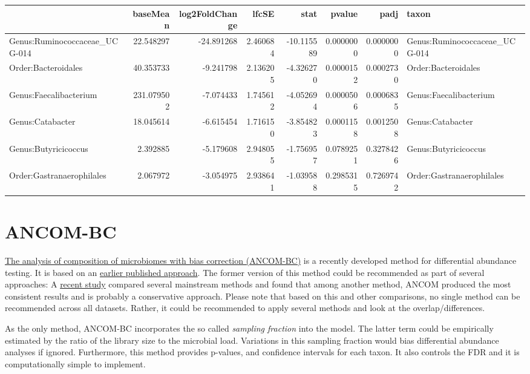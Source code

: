 \documentclass[
  oneside]{book}
\begin{document}
\begin{table}
\centering
\begin{tabular}{l|r|r|r|r|r|r|l}
\hline
  & baseMean & log2FoldChange & lfcSE & stat & pvalue & padj & taxon\\
\hline
Genus:Ruminococcaceae\_UCG-014 & 22.548297 & -24.891268 & 2.460684 & -10.115589 & 0.0000000 & 0.0000000 & Genus:Ruminococcaceae\_UCG-014\\
\hline
Order:Bacteroidales & 40.353733 & -9.241798 & 2.136205 & -4.326270 & 0.0000152 & 0.0002730 & Order:Bacteroidales\\
\hline
Genus:Faecalibacterium & 231.079502 & -7.074433 & 1.745612 & -4.052694 & 0.0000506 & 0.0006835 & Genus:Faecalibacterium\\
\hline
Genus:Catabacter & 18.045614 & -6.615454 & 1.716150 & -3.854823 & 0.0001158 & 0.0012508 & Genus:Catabacter\\
\hline
Genus:Butyricicoccus & 2.392885 & -5.179608 & 2.948055 & -1.756957 & 0.0789251 & 0.3278426 & Genus:Butyricicoccus\\
\hline
Order:Gastranaerophilales & 2.067972 & -3.054975 & 2.938641 & -1.039588 & 0.2985315 & 0.7269742 & Order:Gastranaerophilales\\
\hline
\end{tabular}
\end{table}

\hypertarget{ancom-bc}{%
\section{ANCOM-BC}\label{ancom-bc}}

\href{https://www.nature.com/articles/s41467-020-17041-7}{The analysis of composition of microbiomes with bias correction (ANCOM-BC)}
is a recently developed method for differential abundance testing. It is based on an
\href{https://www.ncbi.nlm.nih.gov/pmc/articles/PMC4450248/}{earlier published approach}.
The former version of this method could be recommended as part of several approaches:
A \href{https://www.biorxiv.org/content/10.1101/2021.05.10.443486v1.full}{recent study}
compared several mainstream methods and found that among another method, ANCOM produced the most consistent results and is probably a conservative approach. Please note that based on this and other comparisons, no single method can be recommended across all datasets. Rather, it could be recommended to apply several methods and look at the overlap/differences.

As the only method, ANCOM-BC incorporates the so called \emph{sampling fraction} into the model. The latter term could be empirically estimated by the ratio of the library size to the microbial load. Variations in this sampling fraction would bias differential abundance analyses if ignored. Furthermore, this method provides p-values, and confidence intervals for each taxon.
It also controls the FDR and it is computationally simple to implement.
\end{document}
